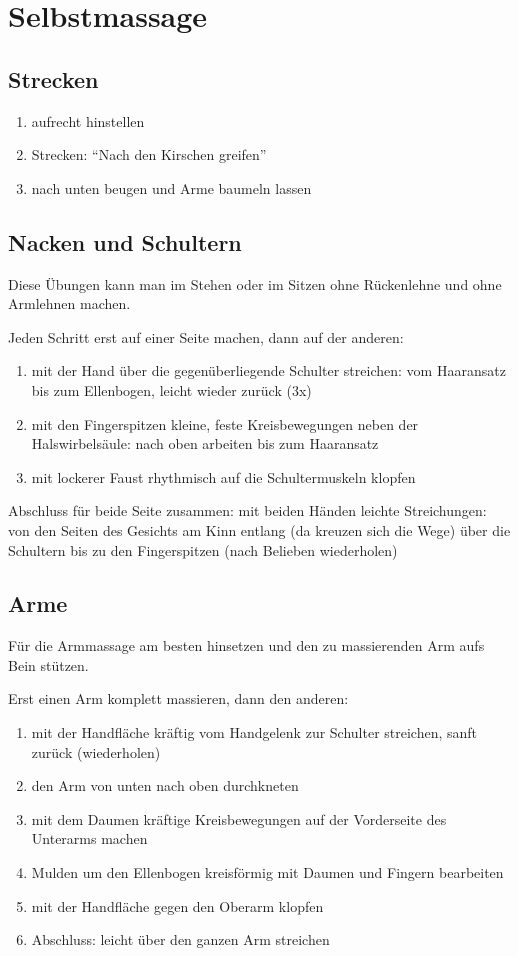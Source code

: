\chapter{Selbstmassage}

\section{Strecken}
\begin{enumerate}
  \item aufrecht hinstellen
  \item Strecken: "`Nach den Kirschen greifen"'
  \item nach unten beugen und Arme baumeln lassen
\end{enumerate}

\section{Nacken und Schultern}
Diese Übungen kann man im Stehen oder im Sitzen ohne Rückenlehne und ohne Armlehnen machen.

Jeden Schritt erst auf einer Seite machen, dann auf der anderen:
\begin{enumerate}
  \item mit der Hand über die gegenüberliegende Schulter streichen: vom Haaransatz bis zum Ellenbogen, leicht wieder zurück (3x)
  \item mit den Fingerspitzen kleine, feste Kreisbewegungen neben der Halswirbelsäule: nach oben arbeiten bis zum Haaransatz
  \item mit lockerer Faust rhythmisch auf die Schultermuskeln klopfen
\end{enumerate}

Abschluss für beide Seite zusammen: mit beiden Händen leichte Streichungen: von den Seiten des Gesichts am Kinn entlang (da kreuzen sich die Wege) über die Schultern bis zu den Fingerspitzen (nach Belieben wiederholen)

\section{Arme}
Für die Armmassage am besten hinsetzen und den zu massierenden Arm aufs Bein stützen.

Erst einen Arm komplett massieren, dann den anderen:
\begin{enumerate}
  \item mit der Handfläche kräftig vom Handgelenk zur Schulter streichen, sanft zurück (wiederholen)
  \item den Arm von unten nach oben durchkneten
  \item mit dem Daumen kräftige Kreisbewegungen auf der Vorderseite des Unterarms machen
  \item Mulden um den Ellenbogen kreisförmig mit Daumen und Fingern bearbeiten
  \item mit der Handfläche gegen den Oberarm klopfen
  \item Abschluss: leicht über den ganzen Arm streichen
\end{enumerate}

